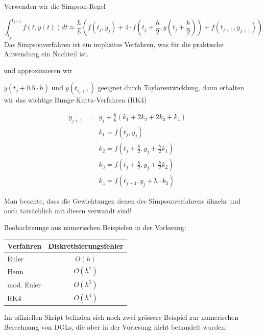 \documentclass[10pt,a4paper]{article}
\begin{document}
Verwenden wir die Simpson-Regel 

\begin{defi}[Simpsonregel]
\begin{equation*}
\int_{t_j}^{t_{j+1}} f(t,y(t)) dt \approx \frac{h}{6} \left(f(t_j,y_j)  + 4 \cdot f(t_j + \frac{h}{2},y(t_j + \frac{h}{2})) + f(t_{j+1},y_{j+1}) \right)
\end{equation*}
Das Simpsonverfahren ist ein implizites Verfahren, was für die praktische Anwendung ein Nachteil ist.
\end{defi}

und approximieren wir 

$y(t_j+0.5\cdot h)$ und $y(t_{t_j+1})$ geeignet durch Taylorentwicklung, dann erhalten wir das wichtige Runge-Kutta-Verfahren (RK4)

\begin{defi}
\begin{eqnarray}
y_{j+1}&=& y_j+\frac{h}{6}(k_1+2k_2+2k_3+k_4) \\
&& k_1=f(t_j,y_j) \nonumber \\
&& k_2=f(t_j+\frac{h}{2},y_j+\frac{h}{2}k_1) \nonumber\\
&& k_3=f(t_j+\frac{h}{2},y_j+\frac{h}{2}k_2) \nonumber\\
&& k_4=f(t_{j+1},y_j+h\cdot k_3) \nonumber
\end{eqnarray}
\end{defi}

Man beachte, dass die Gewichtungen denen des Simpsonverfahrens ähneln und auch tatsächlich mit diesen verwandt sind!

Beobachteunge aus numerischen Beispielen in der Vorlesung:

\begin{table}[H]
\centering

\begin{tabular}{ |l c| }
	\hline
  Verfahren & Diskretisierungsfehler \\ \hline \hline
  Euler & $O(h)$\\
  Heun & $O(h^{2})$ \\
  mod. Euler & $O(h^{2})$ \\
  RK4 & $O(h^{4})$ \\ \hline
\end{tabular}
\end{table}

Im offiziellen Skript befinden sich noch zwei grössere Beispiel zur numerischen Berechnung von DGLs, die aber in der Vorlesung nicht behandelt wurden.
\end{document}
